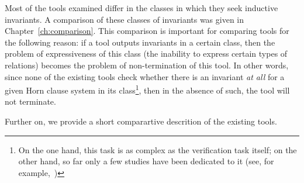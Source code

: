 Most of the tools examined differ in the classes in which they seek inductive invariants. A comparison of these classes of invariants was given in Chapter~\cref{ch:comparison}. This comparison is important for comparing tools for the following reason: if a tool outputs invariants in a certain class, then the problem of expressiveness of this class (the inability to express certain types of relations) becomes the problem of non-termination of this tool. In other words, since none of the existing tools check whether there is an invariant \emph{at all} for a given Horn clause system in its class\footnote{On the one hand, this task is as complex as the verification task itself; on the other hand, so far only a few studies have been dedicated to it (see, for example,~\cite{10.1145/3022187,10.1145/2837614.2837640})}, then in the absence of such, the tool will not terminate.

Further on, we provide a short comparartive descrition of the existing tools.

